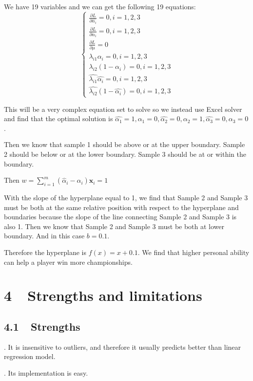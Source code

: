 \documentclass{article}
\begin{document}
We have 19 variables and we can get the following 19 equations:
$$
\left\{\begin{array}{l}
\frac{\partial L}{\partial\hat{\alpha_i}} = 0, i=1,2,3 \\
\frac{\partial L}{\partial\alpha_i} = 0, i=1,2,3 \\
\frac{\partial L}{\partial\mu} = 0 \\
\lambda_{i1}\alpha_i = 0, i=1,2,3 \\
\lambda_{i2}(1-\alpha_i) = 0, i=1,2,3 \\
\hat{\lambda_{i1}}\hat{\alpha_i} = 0, i=1,2,3 \\
\hat{\lambda_{i2}}(1-\hat{\alpha_i}) = 0, i=1,2,3
\end{array}\right.
$$

This will be a very complex equation set to solve so we instead use Excel solver and find that the optimal solution is $\hat{\alpha_1} = 1, \alpha_1 = 0, \hat{\alpha_2} = 0, \alpha_2 = 1, \hat{\alpha_3} = 0, \alpha_3 = 0$.

Then we know that sample 1 should be above or at the upper boundary. Sample 2 should be below or at the lower boundary. Sample 3 should be at or within the boundary.

Then $w = \sum_{i=1}^m\left(\hat{\alpha}_i-\alpha_i\right) \boldsymbol{x}_i = 1$

With the slope of the hyperplane equal to 1, we find that Sample 2 and Sample 3 must be both at the same relative position with respect to the hyperplane and boundaries because the slope of the line connecting Sample 2 and Sample 3 is also 1. Then we know that Sample 2 and Sample 3 must be both at lower boundary. And in this case $b=0.1$.

Therefore the hyperplane is $f(x) = x+ 0.1$. We find that higher personal ability can help a player win more championships.

\section*{4 $    $ $  $ Strengths and limitations}

\subsection*{4.1 $    $ $  $ Strengths}

. It is insensitive to outliers, and therefore it usually predicts better than linear regression model.

. Its implementation is easy.
\end{document}
